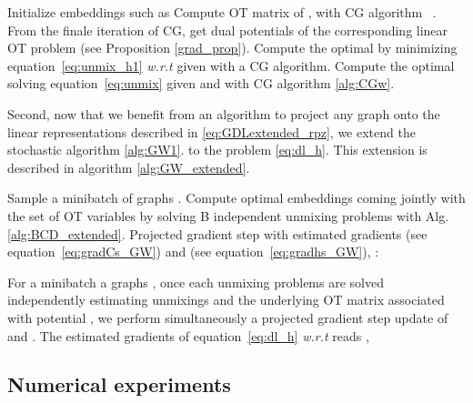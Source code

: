 \documentclass{article}
\def\eqref#1{equation~\ref{#1}}
\begin{document}
	\begin{algorithm}[H]
		\caption{BCD for extended GW unmixing problem inherent to \eqref{eq:dl_h}}
		\label{alg:BCD_extended}
		\begin{algorithmic}[1]
			\STATE Initialize embeddings such as 
			\REPEAT
			\STATE Compute OT matrix  of , with CG algorithm ~\citep[Alg.1 \& 2]{vayer-fused-2018}.  From the finale iteration of CG, get dual potentials  of the corresponding linear OT problem (see Proposition \ref{grad_prop}).
			\STATE Compute the optimal  by minimizing \eqref{eq:unmix_h1} \emph{w.r.t}  given  with a CG algorithm. 
			\STATE Compute the optimal  solving \eqref{eq:unmix} given 
			 and  with CG algorithm \ref{alg:CGw}. 
		\end{algorithmic}
	\end{algorithm}
	
	Second, now that we benefit from an algorithm to project any graph  onto the linear representations described in \ref{eq:GDLextended_rpz}, we extend the stochastic algorithm \ref{alg:GW1}. to the problem \ref{eq:dl_h}. This extension is described in algorithm \ref{alg:GW_extended}. 
	
	\begin{algorithm}[h]
		\caption{extended GDL: stochastic update of atoms }
		\label{alg:GW_extended}
		\begin{algorithmic}[1]
			\STATE Sample a minibatch of graphs  .
			\STATE Compute optimal embeddings  coming jointly with the set of OT variables  by solving B independent unmixing problems with Alg.\ref{alg:BCD_extended}. 
			\STATE Projected gradient step with estimated gradients  (see \eqref{eq:gradCs_GW}) and  (see \eqref{eq:gradhs_GW}), : \vspace{-2mm}
			
		\end{algorithmic}
	\end{algorithm}
	For a minibatch a graphs , once each unmixing problems are solved independently estimating unmixings  and the underlying OT matrix  associated with potential , we perform simultaneously a projected gradient step
	update of  and . The estimated gradients of \eqref{eq:dl_h} \emph{w.r.t}  reads ,
	
	
	\subsection{Numerical experiments}
	
\end{document}
